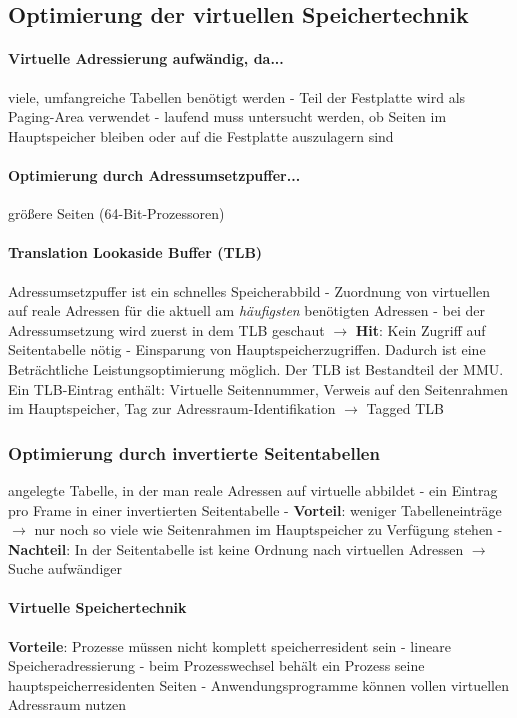 \documentclass[10pt,a4paper,landscape]{article}
\begin{document}
\begin{multicols*}{3}
	\subsection{Optimierung der virtuellen Speichertechnik}
	\paragraph{Virtuelle Adressierung aufwändig, da...} viele, umfangreiche Tabellen benötigt werden - Teil der Festplatte wird als Paging-Area verwendet - laufend muss untersucht werden, ob Seiten im Hauptspeicher bleiben oder auf die Festplatte auszulagern sind
	\paragraph{Optimierung durch Adressumsetzpuffer...} größere Seiten (64-Bit-Prozessoren)
	\paragraph{Translation Lookaside Buffer (TLB)} Adressumsetzpuffer ist ein schnelles Speicherabbild - Zuordnung von virtuellen auf reale Adressen für die aktuell am \textit{häufigsten} benötigten Adressen - bei der Adressumsetzung wird zuerst in dem TLB geschaut $\rightarrow$ \textbf{Hit}: Kein Zugriff auf Seitentabelle nötig - Einsparung von Hauptspeicherzugriffen. Dadurch ist eine Beträchtliche Leistungsoptimierung möglich. Der TLB ist Bestandteil der MMU. Ein TLB-Eintrag enthält: Virtuelle Seitennummer, Verweis auf den Seitenrahmen im Hauptspeicher, Tag zur Adressraum-Identifikation $\rightarrow$ Tagged TLB
	\subsubsection{Optimierung durch invertierte Seitentabellen}
	angelegte Tabelle, in der man reale Adressen auf virtuelle abbildet - ein Eintrag pro Frame in einer invertierten Seitentabelle - \textbf{Vorteil}: weniger Tabelleneinträge $\rightarrow$ nur noch so viele wie Seitenrahmen im Hauptspeicher zu Verfügung stehen - \textbf{Nachteil}: In der Seitentabelle ist keine Ordnung nach virtuellen Adressen $\rightarrow$ Suche aufwändiger
	\paragraph{Virtuelle Speichertechnik} \textbf{Vorteile}: Prozesse müssen nicht komplett speicherresident sein - lineare Speicheradressierung - beim Prozesswechsel behält ein Prozess seine hauptspeicherresidenten Seiten - Anwendungsprogramme können vollen virtuellen Adressraum nutzen
	

\end{multicols*}
\end{document}
